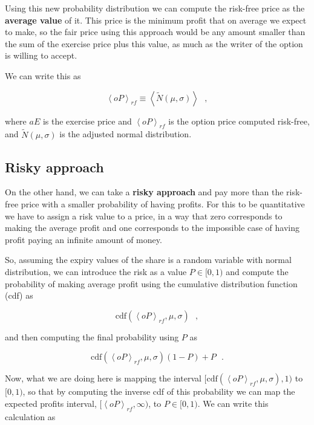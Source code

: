 \documentclass[8 pt]{article}
\newcommand{\avg}[1]{\left\langle #1 \right\rangle}
\begin{document}
Using this new probability distribution we can compute the risk-free price as the \textbf{average value} of it. This price is the minimum profit that on average we expect to make, so the fair price using this approach would be any amount smaller than the sum of the exercise price plus this value, as much as the writer of the option is willing to accept.

We can write this as

\begin{equation}
  \avg{oP}_{rf} \equiv \avg{\tilde N(\mu, \sigma)} ~~~ ,
\end{equation}

where $aE$ is the exercise price and $\avg{oP}_{rf}$ is the option price computed risk-free, and $\tilde N(\mu, \sigma)$ is the adjusted normal distribution.

\subsection{Risky approach}

On the other hand, we can take a \textbf{risky approach} and pay more than the risk-free price with a smaller probability of having profits. For this to be quantitative we have to assign a risk value to a price, in a way that zero corresponds to making the average profit and one corresponds to the impossible case of having profit paying an infinite amount of money.

So, assuming the expiry values of the share is a random variable with normal distribution, we can introduce the risk as a value $P \in [0, 1)$ and compute the probability of making average profit using the cumulative distribution function (cdf) as

\begin{equation*}
  \text{cdf}(\avg{oP}_{rf}, \mu, \sigma) ~~~ ,
\end{equation*}

and then computing the final probability using $P$ as

\begin{equation*}
  \text{cdf}(\avg{oP}_{rf}, \mu, \sigma)(1 - P) + P ~~~ .
\end{equation*}

Now, what we are doing here is mapping the interval $[\text{cdf}(\avg{oP}_{rf}, \mu, \sigma), 1)$ to $[0, 1)$, so that by computing the inverse cdf of this probability we can map the expected profits interval, $[\avg{oP}_{rf}, \infty)$, to $P \in [0, 1)$. We can write this calculation as
\end{document}
